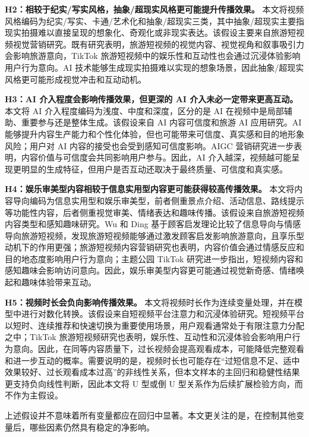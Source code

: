 \textbf{H2：相较于纪实/写实风格，抽象/超现实风格更可能提升传播效果。} 本文将视频风格编码为纪实/写实、卡通/艺术化和抽象/超现实三类，其中抽象/超现实主要指现实拍摄难以直接呈现的想象化、奇观化或非现实表达。该假设主要来自旅游短视频视觉营销研究。既有研究表明，旅游短视频的视觉内容、视觉视角和叙事吸引力会影响旅游意向\cite{lit06}，TikTok 旅游短视频中的娱乐性和互动性也会通过沉浸体验影响用户行为意向\cite{lit05}。AI 技术能够生成现实拍摄难以实现的想象场景，因此抽象/超现实风格更可能形成视觉冲击和互动动机。

\textbf{H3：AI 介入程度会影响传播效果，但更深的 AI 介入未必一定带来更高互动。} 本文将 AI 介入程度编码为浅度、中度和深度，区分的是 AI 在视频中是局部辅助、重要参与还是整体生成。该假设来自 AI 内容可信度和旅游 AI 应用研究。AI 能够提升内容生产能力和个性化体验，但也可能带来可信度、真实感和目的地形象风险\cite{lit23}；用户对 AI 内容的接受也会受到感知可信度影响\cite{lit14}。AIGC 营销研究进一步表明，内容价值与可信度会共同影响用户参与\cite{lit18}。因此，AI 介入越深，视频越可能呈现更明显的生成特征，但用户是否互动还取决于最终质量、可信度和真实感。

\textbf{H4：娱乐审美型内容相较于信息实用型内容更可能获得较高传播效果。} 本文将内容导向编码为信息实用型和娱乐审美型，前者侧重景点介绍、活动信息、路线提示等功能性内容，后者侧重视觉审美、情绪表达和趣味传播。该假设来自旅游短视频内容类型和感知趣味研究。Wu 和 Ding 基于顾客启发理论比较了信息导向与情感导向旅游短视频，发现旅游短视频能够通过激发顾客启发影响旅游意向，且享乐型动机下的作用更强\cite{lit22}；旅游短视频内容营销研究也表明，内容价值会通过情感反应和目的地态度影响用户行为意向\cite{lit04}；主题公园 TikTok 研究进一步指出，短视频内容和感知趣味会影响访问意向\cite{lit17}。因此，娱乐审美型内容更可能通过视觉新奇感、情绪唤起和趣味体验带来互动。

\textbf{H5：视频时长会负向影响传播效果。} 本文将视频时长作为连续变量处理，并在模型中进行对数化转换。该假设来自短视频平台注意力和沉浸体验研究。短视频平台以短时、连续推荐和快速切换为重要使用场景，用户观看通常处于有限注意力分配之中\cite{lit21}；TikTok 旅游短视频研究也表明，娱乐性、互动性和沉浸体验会影响用户行为意向\cite{lit05}。因此，在同等内容质量下，过长视频会提高观看成本，可能降低完整观看和进一步互动的概率。需要说明的是，视频时长也可能存在“过短信息不足、适中效果较好、过长观看成本过高”的非线性关系，但本文样本的主回归和稳健性结果更支持负向线性判断，因此本文将 U 型或倒 U 型关系作为后续扩展检验方向，而不作为主假设。

上述假设并不意味着所有变量都应在回归中显著。本文更关注的是，在控制其他变量后，哪些因素仍然具有稳定的净影响。

